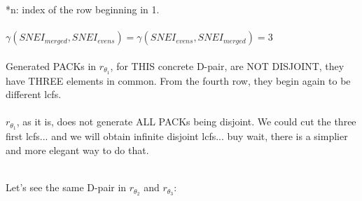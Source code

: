 	\noindent
	*n: index of the row beginning in 1.
	\\\\
	
	\noindent
	$\gamma(SNEI_{merged}, SNEI_{evens}) = \gamma(SNEI_{evens}, SNEI_{merged}) = 3 $
	\\\\
	
	\noindent
	Generated PACKs in $r_{\theta_{1}}$, for THIS concrete D-pair, are NOT DISJOINT, they have THREE elements in common. From the fourth row, they begin again to be different lcfs.
	\\\\
	
	\noindent
	$r_{\theta_{1}}$, as it is, does not generate ALL PACKs being disjoint. We could cut the three first lcfs... and we will obtain infinite disjoint lcfs... buy wait, there is a simplier and more elegant way to do that.
	\\\\
	
	\newpage
	
	\noindent
	Let's see the same D-pair in $r_{\theta_{2}}$ and $r_{\theta_{3}}$:
	\\\\
	
